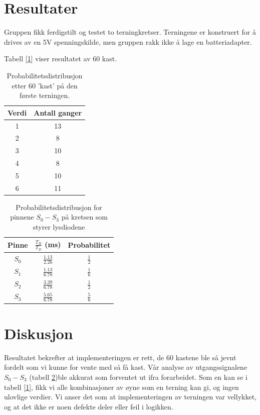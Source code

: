 \documentclass[12pt,norsk,a4paper]{article}
\begin{document}
\section{Resultater}
Gruppen fikk ferdigstilt og testet to terningkretser. Terningene er konstruert for å drives av en 5V spenningskilde, men gruppen rakk ikke å lage en batteriadapter. 



Tabell [\ref{tbl:probabilitetsdistribusjon}] viser resultatet av 60 kast.
\begin{table}[H]
    \begin{center}
    \begin{tabular}{|c|c|}
    \hline
    Verdi & Antall ganger\\ \hline
    1 & 13 \\ \hline
    2 & 8  \\ \hline
    3 & 10 \\ \hline
    4 & 8  \\ \hline
    5 & 10 \\ \hline
    6 & 11 \\ \hline
    \end{tabular}
    \caption{Probabilitetsdistribusjon etter 60 'kast' på den første terningen.}
    \label{tbl:probabilitetsdistribusjon}
    \end{center}
    \end{table}


\begin{table}[H]
    \begin{center}
    \begin{tabular}{|c|c|c|}
    \hline
    Pinne & $\frac{T_H}{T_D}$ (ms) & Probabilitet   \\[1mm] \hline
    $S_0$ & $\frac{1.13}{2.26}$  & $\frac{1}{2}$    \\[1mm] \hline
    $S_1$ & $\frac{1.13}{6.78}$  & $\frac{1}{6}$    \\[1mm] \hline
    $S_2$ & $\frac{3.39}{6.78}$  & $\frac{1}{2}$    \\[1mm]\hline
    $S_3$ & $\frac{5.65}{6.78}$  & $\frac{5}{6}$    \\[1mm] \hline
    \end{tabular}
    \caption{Probabilitetsdistribusjon for pinnene $S_0 - S_3$  på kretsen som styrer lysdiodene}
    \label{tbl:probe}
    \end{center}
    \end{table}

\clearpage

\section{Diskusjon}
Resultatet bekrefter at implementeringen er rett, de 60 kastene ble så jevnt fordelt som vi kunne for vente med så få kast. Vår analyse av utgangssignalene $S_0 - S_3$ (tabell \ref{tbl:probe})ble akkurat som forventet ut ifra forarbeidet. Som en kan se i tabell [\ref{tbl:probabilitetsdistribusjon}], fikk vi alle kombinasjoner av øyne som en terning kan gi, og ingen ulovlige verdier. Vi anser det som at implementeringen av terningen var vellykket, og at det ikke er noen defekte deler eller feil i logikken. 
\end{document}
